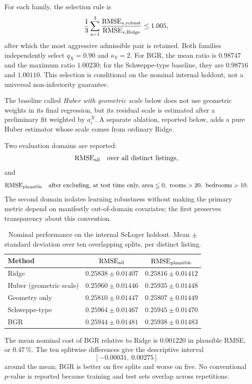 \documentclass[10pt,a4paper]{article}
\begin{document}
For each family, the selection rule is
\[
\frac13\sum_{s=1}^{3}
\frac{\mathrm{RMSE}_{s,\rm robust}}
     {\mathrm{RMSE}_{s,\rm Ridge}}
\le 1.005,
\]
after which the most aggressive admissible pair is retained. Both families independently select $q_X=0.90$ and $\kappa_Y=2$. For BGR, the mean ratio is $0.98747$ and the maximum ratio $1.00230$; for the Schweppe-type baseline, they are $0.98716$ and $1.00110$. This selection is conditional on the nominal internal holdout, not a universal non-inferiority guarantee.

The baseline called \emph{Huber with geometric scale} below does not use geometric weights in its final regression, but its residual scale is estimated after a preliminary fit weighted by $a_i^X$. A separate ablation, reported below, adds a pure Huber estimator whose scale comes from ordinary Ridge.

Two evaluation domains are reported:
\[
\mathrm{RMSE}_{\rm all}
\quad\text{over all distinct listings,}
\]
and
\[
\mathrm{RMSE}_{\rm plausible}
\quad\text{after excluding, at test time only, }
\text{area}\le0,\ \text{rooms}>20,\ \text{bedrooms}>10.
\]
The second domain isolates learning robustness without making the primary metric depend on manifestly out-of-domain covariates; the first preserves transparency about this convention.

\begin{table}[H]
\centering
\caption{Nominal performance on the internal SeLoger holdout. Mean $\pm$ standard deviation over ten overlapping splits, per distinct listing.}
\label{tab:seloger-nominal}
\small
\begin{tabular}{@{}lcc@{}}
\toprule
Method & $\mathrm{RMSE}_{\rm all}$ & $\mathrm{RMSE}_{\rm plausible}$ \\
\midrule
Ridge & $0.25838\pm0.01407$ & $0.25816\pm0.01412$ \\
Huber (geometric scale) & $0.25960\pm0.01446$ & $0.25935\pm0.01448$ \\
Geometry only & $0.25810\pm0.01447$ & $0.25807\pm0.01449$ \\
Schweppe-type & $0.25964\pm0.01467$ & $0.25945\pm0.01470$ \\
BGR & $0.25944\pm0.01481$ & $0.25938\pm0.01483$ \\
\bottomrule
\end{tabular}
\end{table}

The mean nominal cost of BGR relative to Ridge is $0.001220$ in plausible RMSE, or $0.47\,\%$. The ten splitwise differences give the descriptive interval
\[
[-0.00031,\ 0.00275]
\]
around the mean; BGR is better on five splits and worse on five. No conventional $p$-value is reported because training and test sets overlap across repetitions.
\end{document}
